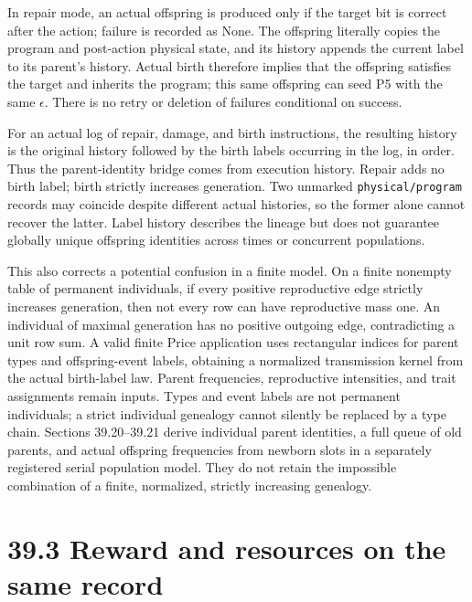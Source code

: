 \documentclass[
  english,
  11pt,
  oneside]{book}
\newcounter{none} %
\begin{document}
In repair mode, an actual offspring is produced only if the target bit is correct after the action; failure is recorded as None. The offspring literally copies the program and post-action physical state, and its history appends the current label to its parent's history. Actual birth therefore implies that the offspring satisfies the target and inherits the program; this same offspring can seed P5 with the same \(\epsilon\). There is no retry or deletion of failures conditional on success.

For an actual log of repair, damage, and birth instructions, the resulting history is the original history followed by the birth labels occurring in the log, in order. Thus the parent-identity bridge comes from execution history. Repair adds no birth label; birth strictly increases generation. Two unmarked \nolinkurl{physical/program} records may coincide despite different actual histories, so the former alone cannot recover the latter. Label history describes the lineage but does not guarantee globally unique offspring identities across times or concurrent populations.

This also corrects a potential confusion in a finite model. On a finite nonempty table of permanent individuals, if every positive reproductive edge strictly increases generation, then not every row can have reproductive mass one. An individual of maximal generation has no positive outgoing edge, contradicting a unit row sum. A valid finite Price application uses rectangular indices for parent types and offspring-event labels, obtaining a normalized transmission kernel from the actual birth-label law. Parent frequencies, reproductive intensities, and trait assignments remain inputs. Types and event labels are not permanent individuals; a strict individual genealogy cannot silently be replaced by a type chain. Sections 39.20--39.21 derive individual parent identities, a full queue of old parents, and actual offspring frequencies from newborn slots in a separately registered serial population model. They do not retain the impossible combination of a finite, normalized, strictly increasing genealogy.

\section{39.3 Reward and resources on the same record}\label{reward-and-resources-on-the-same-record}
\end{document}
